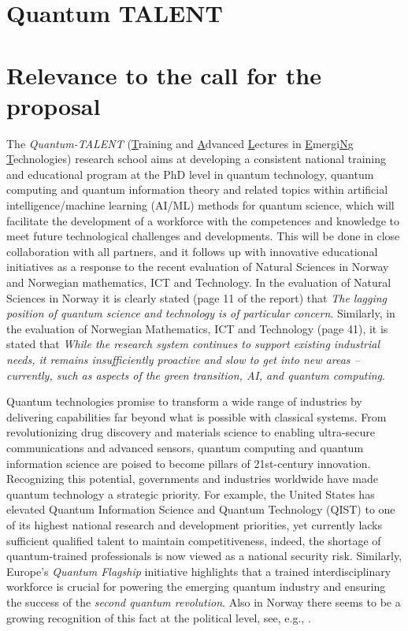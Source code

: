 \documentclass{scrreprt}
\author{Oslo Metropolitan University}
\date{\today}
\title{}
\begin{document}
\section*{\LARGE{Quantum TALENT}}





\section{Relevance to the call for the proposal}

The \textit{Quantum-TALENT} (\underline{T}raining and \underline{A}dvanced
\underline{L}ectures in \underline{E}mergi\underline{N}g
\underline{T}echnologies) research school aims at developing a consistent national training and
educational program at the PhD level in quantum technology, quantum
computing and quantum information theory and related topics within  artificial
intelligence/machine learning (AI/ML) methods for quantum science,
which will facilitate the development of a workforce with the
competences and knowledge to meet future technological challenges and
developments. This will  be done in close collaboration with all
partners, and it follows up with innovative educational initiatives  as a response to the recent evaluation of Natural Sciences in Norway and Norwegian mathematics, ICT and Technology\cite{evalnat,evalmat}.  In the evaluation of Natural Sciences in Norway \cite{evalnat} it is clearly stated (page 11 of the report) that \textit{The lagging
position of quantum science and technology is of particular concern}.  Similarly, in the evaluation of Norwegian Mathematics, ICT and Technology \cite{evalmat} (page 41), it is stated that \textit{While the research system continues to support existing industrial needs, it remains insufficiently proactive and slow to get into new areas – currently, such as aspects of the green transition, AI, and quantum computing}. 

Quantum technologies promise to transform a wide range of industries
by delivering capabilities far beyond what is possible with classical
systems. From revolutionizing drug discovery and materials science to
enabling ultra-secure communications and advanced sensors, quantum
computing and quantum information science are poised to become pillars
of 21st-century innovation. Recognizing this potential, governments
and industries worldwide have made quantum technology a strategic
priority. For example, the United States has elevated Quantum
Information Science and Quantum Technology (QIST) \cite{usquantum} to one of its highest
national research and development priorities, yet currently lacks
sufficient qualified talent to maintain competitiveness, indeed, the
shortage of quantum-trained professionals is now viewed as a national
security risk. Similarly, Europe’s \textit{Quantum Flagship} \cite{euquantum}
initiative highlights that a trained interdisciplinary workforce is crucial for powering
the emerging quantum industry and ensuring the success of the {\em
  second quantum revolution}.
Also in Norway there seems to be a growing recognition of this fact at the political level, see, e.g., \cite{StM14}.
\end{document}

